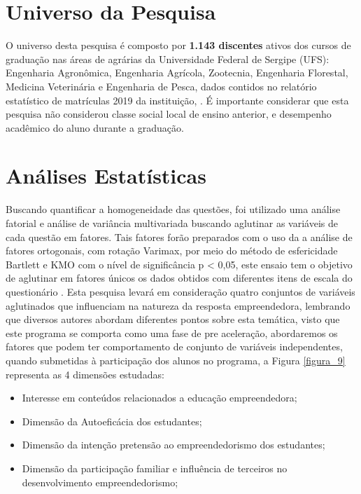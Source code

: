 \section{Universo da Pesquisa}

O universo desta pesquisa é composto por \textbf{1.143 discentes} ativos dos cursos de graduação nas áreas de agrárias da Universidade Federal de Sergipe (UFS): Engenharia Agronômica, Engenharia Agrícola, Zootecnia, Engenharia Florestal, Medicina Veterinária e Engenharia de Pesca, dados contidos no relatório estatístico de matrículas 2019 da instituição, \cite{campelo_ufs_2018}. É importante considerar que esta pesquisa não considerou classe social local de ensino anterior, e desempenho acadêmico do aluno durante a graduação.

\section{Análises Estatísticas}


Buscando quantificar a homogeneidade das questões, foi utilizado uma análise fatorial e análise de variância multivariada buscando aglutinar as variáveis de cada questão em fatores. Tais fatores forão preparados com o uso da a análise de fatores ortogonais, com rotação Varimax, por meio do método de esfericidade Bartlett e KMO com o nível de significância p < 0,05, este ensaio tem o objetivo de aglutinar em fatores únicos os dados obtidos com diferentes itens de escala do questionário \cite{hair_multivariate_2006}. Esta pesquisa levará em consideração quatro conjuntos de variáveis aglutinados que influenciam na natureza da resposta empreendedora, lembrando que diversos autores abordam diferentes pontos sobre esta temática, visto que este programa se comporta como uma fase de pre aceleração, abordaremos os fatores que podem ter comportamento de conjunto de variáveis independentes, quando submetidas à participação dos alunos no programa, a Figura \ref{figura_9} representa as 4 dimensões estudadas:


\begin{itemize}
\item {Interesse em conteúdos relacionados a educação empreendedora;}
\item {Dimensão da Autoeficácia dos estudantes;}
\item {Dimensão da intenção pretensão ao empreendedorismo dos estudantes;}
\item {Dimensão da participação familiar e influência de terceiros no desenvolvimento empreendedorismo;}
\end{itemize}

